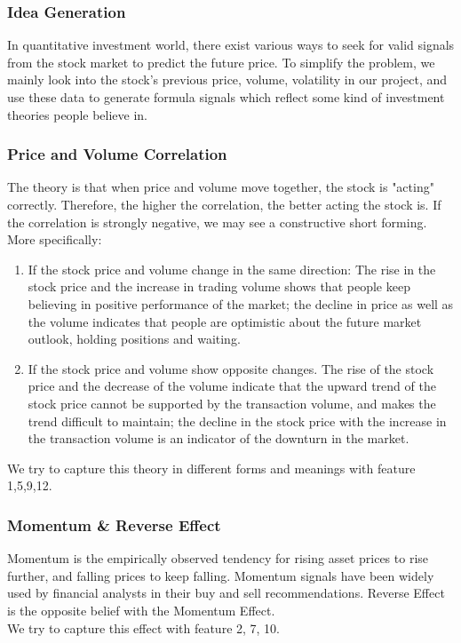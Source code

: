 \documentclass[fleqn,10pt]{SelfArx} %
\begin{document}
\subsubsection*{Idea Generation}
In quantitative investment world, there exist various ways to seek for valid signals from the stock market to predict the future price. To simplify the problem, we mainly look into the stock's previous price, volume, volatility in our project, and use these data to generate formula signals which reflect some kind of investment theories people believe in.
\subsubsection*{Price and Volume Correlation}
The theory is that when price and volume move together, the stock is "acting" correctly. Therefore, the higher the correlation, the better acting the stock is. If the correlation is strongly negative, we may see a constructive short forming. More specifically: 
\noindent
\begin{enumerate}
    \item If the stock price and volume change in the same direction: The rise in the stock price and the increase in trading volume shows that people keep believing in positive performance of the market; the decline in price as well as the volume indicates that people are optimistic about the future market outlook, holding positions and waiting.
    \item If the stock price and volume show opposite changes. The rise of the stock price and the decrease of the volume indicate that the upward trend of the stock price cannot be supported by the transaction volume, and makes the trend difficult to maintain; the decline in the stock price with the increase in the transaction volume is an indicator of the downturn in the market.
\end{enumerate}

\noindent
We try to capture this theory in different forms and meanings with feature 1,5,9,12.

\subsubsection*{Momentum \& Reverse Effect}
Momentum is the empirically observed tendency for rising asset prices to rise further, and falling prices to keep falling. Momentum signals have been widely used by financial analysts in their buy and sell recommendations. Reverse Effect is the opposite belief with the Momentum Effect.\\
\noindent
We try to capture this effect with feature 2, 7, 10.
\end{document}
